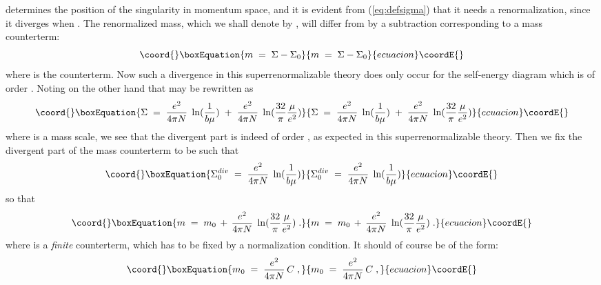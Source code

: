 \documentclass[12pt,a4paper]{article} \usepackage[latin1] {inputenc}
\begin{document}
\myHighlight{$\Sigma$}\coordHE{} determines the position of the singularity in momentum space,
and it is evident from (\ref{eq:defsigma}) that it needs a
renormalization, since it diverges when \coordHE{}. The renormalized
mass, which we shall denote by \coordHE{}, will differ from \myHighlight{$\Sigma$}\coordHE{} by a
subtraction corresponding to a mass counterterm:
\begin{equation}\coord{}\boxEquation{
m \;=\; \Sigma - \Sigma_0
}{
m \;=\; \Sigma - \Sigma_0
}{ecuacion}\coordE{}\end{equation}
where \coordHE{} is the counterterm. Now such a divergence in this
superrenormalizable theory does only occur for the self-energy diagram
which is of order \coordHE{}.  Noting on the other hand that \myHighlight{$\Sigma$}\coordHE{} may
be rewritten as
\begin{equation}\coord{}\boxEquation{\label{eq:sigma1}
\Sigma \;=\; 
\frac{e^2}{4 \pi N} \; \ln(\frac{1}{b \mu}) \;+\;
\frac{e^2}{4 \pi N} \; \ln(\frac{32}{\pi} \frac{\mu}{e^2})
}{\Sigma \;=\; 
\frac{e^2}{4 \pi N} \; \ln(\frac{1}{b \mu}) \;+\;
\frac{e^2}{4 \pi N} \; \ln(\frac{32}{\pi} \frac{\mu}{e^2})
}{ecuacion}\coordE{}\end{equation}
where \myHighlight{$\mu$}\coordHE{} is a mass scale, we see that the divergent part
\mbox{\coordHE{}} is indeed of order
\coordHE{}, as expected in this superrenormalizable theory. Then
we fix the divergent part of the mass counterterm to be such that
\begin{equation}\coord{}\boxEquation{\label{eq:ct}
\Sigma_0^{div} \;=\; \frac{e^2}{4 \pi N} \; \ln(\frac{1}{b\mu})
}{\Sigma_0^{div} \;=\; \frac{e^2}{4 \pi N} \; \ln(\frac{1}{b\mu})
}{ecuacion}\coordE{}\end{equation}
so that
\begin{equation}\coord{}\boxEquation{\label{eq:mr}
m \;=\; m_0 \,+\, \frac{e^2}{4 \pi N} \;\ln(\frac{32}{\pi} \frac{\mu}{e^2})\;.
}{m \;=\; m_0 \,+\, \frac{e^2}{4 \pi N} \;\ln(\frac{32}{\pi} \frac{\mu}{e^2})\;.
}{ecuacion}\coordE{}\end{equation}
where \coordHE{} is a {\em finite\/} counterterm, which has to be fixed by
a normalization condition. It should of course be of the form:
\begin{equation}\coord{}\boxEquation{
m_0 \;=\; \frac{e^2}{4 \pi N} \, C \;,
}{
m_0 \;=\; \frac{e^2}{4 \pi N} \, C \;,
}{ecuacion}\coordE{}\end{equation}
\end{document}
